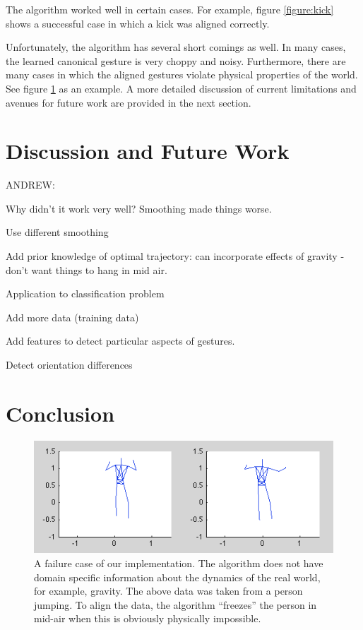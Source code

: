 \documentclass{article}
\begin{document}
The algorithm worked well in certain cases. For example, figure
\ref{figure:kick} shows a successful case in which a kick was aligned correctly.


Unfortunately, the algorithm has several short comings as well. In many cases,
the learned canonical gesture is very choppy and noisy. Furthermore, there are
many cases in which the aligned gestures violate physical properties of the
world. See figure \ref{figure:jump} as an example. A more detailed discussion of
current limitations and avenues for future work are provided in the next
section.




\section{Discussion and Future Work}

ANDREW:

Why didn't it work very well? Smoothing made things worse.

Use different smoothing

Add prior knowledge of optimal trajectory: can incorporate effects of gravity
- don't want things to hang in mid air.

Application to classification problem

Add more data (training data)

Add features to detect particular aspects of gestures.

Detect orientation differences



\section{Conclusion}


\begin{figure}
\begin{centering}
\includegraphics[width=\columnwidth]{figures/jump.png}

\caption{A failure case of our implementation. The algorithm does not have
domain specific information about the dynamics of the real world, for example,
gravity. The above data was taken from a person jumping. To align the data,
the algorithm ``freezes'' the person in mid-air when this is obviously
physically impossible. \label{figure:jump}}

\end{centering}
\end{figure}
\end{document}

